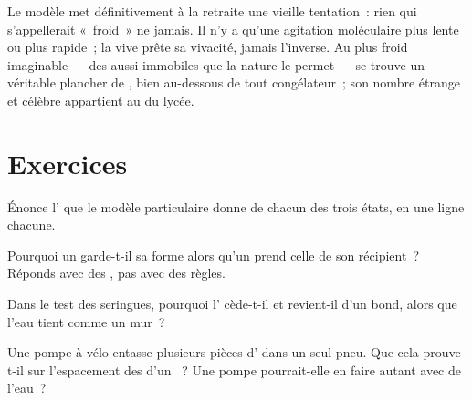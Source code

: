 \begin{example}\label{ex:g7:states-of-matter:cold}
Le modèle met définitivement à la retraite une vieille tentation~:
rien qui s'appellerait «~froid~» ne  jamais. Il n'y a qu'une
agitation moléculaire plus lente ou plus rapide~; la vive prête sa
vivacité, jamais l'inverse. Au plus froid imaginable --- des
 aussi immobiles que la nature le permet --- se trouve un
véritable plancher de , bien au-dessous de tout
congélateur~; son nombre étrange et célèbre appartient au  du
lycée.
\end{example}

\section{Exercices}

\begin{exercise}[$\star$]\label{exo:g7:states-of-matter:1}
Énonce l' que le modèle particulaire donne de chacun des trois
états, en une ligne chacune.
\end{exercise}

\begin{exercise}[$\star$]\label{exo:g7:states-of-matter:2}
Pourquoi un  garde-t-il sa forme alors qu'un  prend
celle de son récipient~? Réponds avec des , pas avec des
règles.
\end{exercise}

\begin{exercise}[$\star$]\label{exo:g7:states-of-matter:3}
Dans le test des seringues, pourquoi l' cède-t-il et revient-il
d'un bond, alors que l'eau tient comme un mur~?
\end{exercise}

\begin{exercise}[$\star$]\label{exo:g7:states-of-matter:4}
Une pompe à vélo entasse plusieurs pièces d' dans un seul pneu.
Que cela prouve-t-il sur l'espacement des  d'un ~? Une
pompe pourrait-elle en faire autant avec de l'eau~?
\end{exercise}

